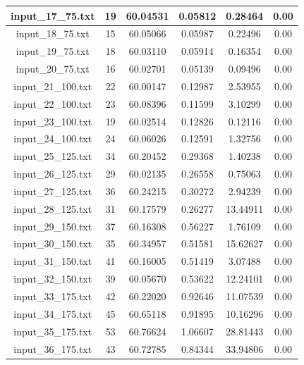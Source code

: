 \begin{center}
\begin{tabular}{|c|c|c|c|c|c|}
		input\_17\_75.txt & 19 & 60.04531 & 0.05812 & 0.28464 & 0.00\\\hline
		input\_18\_75.txt & 15 & 60.05066 & 0.05987 & 0.22496 & 0.00\\\hline
		input\_19\_75.txt & 18 & 60.03110 & 0.05914 & 0.16354 & 0.00\\\hline
		input\_20\_75.txt & 16 & 60.02701 & 0.05139 & 0.09496 & 0.00\\\hline
		input\_21\_100.txt & 22 & 60.00147 & 0.12987 & 2.53955 & 0.00\\\hline
		input\_22\_100.txt & 23 & 60.08396 & 0.11599 & 3.10299 & 0.00\\\hline
		input\_23\_100.txt & 19 & 60.02514 & 0.12826 & 0.12116 & 0.00\\\hline
		input\_24\_100.txt & 24 & 60.06026 & 0.12591 & 1.32756 & 0.00\\\hline
		input\_25\_125.txt & 34 & 60.20452 & 0.29368 & 1.40238 & 0.00\\\hline
		input\_26\_125.txt & 29 & 60.02135 & 0.26558 & 0.75063 & 0.00\\\hline
		input\_27\_125.txt & 36 & 60.24215 & 0.30272 & 2.94239 & 0.00\\\hline
		input\_28\_125.txt & 31 & 60.17579 & 0.26277 & 13.44911 & 0.00\\\hline
		input\_29\_150.txt & 37 & 60.16308 & 0.56227 & 1.76109 & 0.00\\\hline
		input\_30\_150.txt & 35 & 60.34957 & 0.51581 & 15.62627 & 0.00\\\hline
		input\_31\_150.txt & 41 & 60.16005 & 0.51419 & 3.07488 & 0.00\\\hline
		input\_32\_150.txt & 39 & 60.05670 & 0.53622 & 12.24101 & 0.00\\\hline
		input\_33\_175.txt & 42 & 60.22020 & 0.92646 & 11.07539 & 0.00\\\hline
		input\_34\_175.txt & 45 & 60.65118 & 0.91895 & 10.16296 & 0.00\\\hline
		input\_35\_175.txt & 53 & 60.76624 & 1.06607 & 28.81443 & 0.00\\\hline
		input\_36\_175.txt & 43 & 60.72785 & 0.84344 & 33.94806 & 0.00\\\hline
	\end{tabular}
\end{center}

\pagebreak

